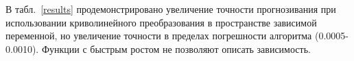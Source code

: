 \documentclass[12pt,twoside]{article}
\begin{document}

В табл.~\ref{results} продемонстрировано увеличение точности прогнозивания при использовании криволинейного преобразования в пространстве зависимой переменной, но увеличение точности в пределах погрешности алгоритма (0.0005-0.0010). Функции с быстрым ростом не позволяют описать зависимость.
\end{document}

